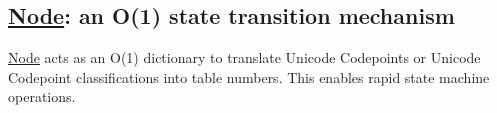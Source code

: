 \subsection*{\hyperlink{class_node}{Node}\+: an O(1) state transition mechanism}

\hyperlink{class_node}{Node} acts as an O(1) dictionary to translate Unicode Codepoints or Unicode Codepoint classifications into table numbers. This enables rapid state machine operations. 